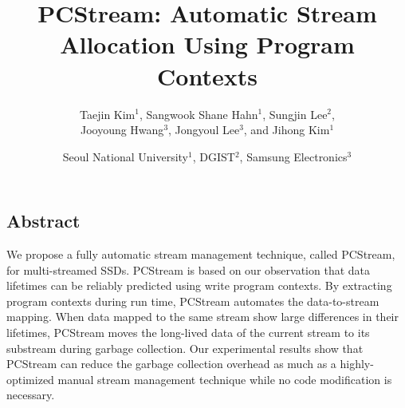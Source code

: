 \documentclass[letterpaper, twocolumn, 10pt]{article}
\begin{document}
\title{
\bf PCStream: Automatic Stream Allocation Using Program Contexts}

\author{
	{\rm Taejin Kim$^1$, Sangwook Shane Hahn$^1$, Sungjin Lee$^2$,} \\ 
	{\rm Jooyoung Hwang$^3$, Jongyoul Lee$^3$, and Jihong Kim$^1$} \\
	\and
	Seoul National University$^1$, DGIST$^2$, Samsung Electronics$^3$
	}

\begin{comment}
\author{
{\rm Taejin Kim}\\
Seoul National University
\and 
{\rm Sangwook Shane Hahn}\\
Seoul National University
\and 
{\rm Sungjin Lee}\\
DGIST
\and 
{\rm Jooyoung Hwang} \\
Samsung Electronics
\and 
{\rm Jongyoul Lee} \\
Samsung Electronics
\and 
{\rm Jihong Kim} \\
Seoul National University
}
\end{comment}

\maketitle
\thispagestyle{empty}

\subsection*{Abstract}
We propose a fully automatic stream management technique, called {\sf PCStream}, 
for multi-streamed SSDs.
{\sf PCStream} is based on our observation that data lifetimes can be reliably predicted using
write program contexts.  
By extracting program contexts during run time,  
{\sf PCStream}  automates the data-to-stream mapping.  
When data mapped to the same
stream show large differences in their lifetimes, {\sf PCStream}
moves the long-lived data of the current stream to 
its substream during garbage collection.
Our experimental results 
show that {\sf PCStream} 
can reduce the garbage collection overhead as much as a highly-optimized 
manual stream management technique 
while no code modification is necessary.







\end{document}
